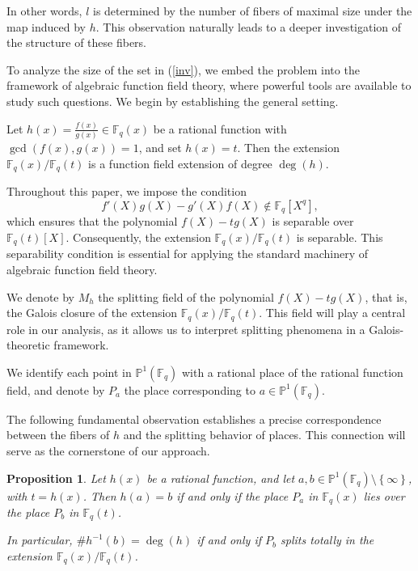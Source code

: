 \documentclass[1p,final]{elsarticle}
\newtheorem{proposition}[theorem]{Proposition}
\newtheorem{open problem}[theorem]{Open Problem}
\begin{document}
In other words, $l$ is determined by the number of fibers of maximal size under the map induced by $h$. This observation naturally leads to a deeper investigation of the structure of these fibers.

\medskip

To analyze the size of the set in (\ref{inv}), we embed the problem into the framework of algebraic function field theory, where powerful tools are available to study such questions. We begin by establishing the general setting.

\medskip

Let $h(x)=\displaystyle\frac{f(x)}{g(x)}\in \mathbb{F}_q(x)$ be a rational function with $\gcd(f(x),g(x))=1$, and set $h(x)=t$. Then the extension $\mathbb{F}_q(x)/\mathbb{F}_q(t)$ is a function field extension of degree $\deg(h)$.

Throughout this paper, we impose the condition 
\[
f'(X)g(X)-g'(X)f(X)\notin \mathbb{F}_{q}[X^{q}],
\]
which ensures that the polynomial $f(X)-tg(X)$ is separable over $\mathbb{F}_{q}(t)[X]$. Consequently, the extension $\mathbb{F}_q(x)/\mathbb{F}_q(t)$ is separable. This separability condition is essential for applying the standard machinery of algebraic function field theory.

\medskip

We denote by $M_{h}$ the splitting field of the polynomial $f(X)-tg(X)$, that is, the Galois closure of the extension $\mathbb{F}_q(x)/\mathbb{F}_q(t)$. This field will play a central role in our analysis, as it allows us to interpret splitting phenomena in a Galois-theoretic framework.

\medskip

We identify each point in $ \mathbb{P}^{1}(\mathbb{F}_{q})$ with a rational place of the rational function field, and denote by $P_{a}$ the place corresponding to $a\in \mathbb{P}^{1}(\mathbb{F}_{q})$.

\medskip

The following fundamental observation establishes a precise correspondence between the fibers of $h$ and the splitting behavior of places. This connection will serve as the cornerstone of our approach.

\begin{proposition}\label{split com} 
Let $h(x)$ be a rational function, and let $a,b\in \mathbb{P}^{1}(\mathbb{F}_{q})\setminus \left \{ \infty  \right \}$, with $t=h(x)$. Then $h(a)=b$ if and only if the place $P_{a}$ in $\mathbb{F}_{q}(x)$ lies over the place $P_{b}$ in $\mathbb{F}_{q}(t)$. 

In particular, $\# h^{-1}(b)=\deg(h)$ if and only if $P_{b}$ splits totally in the extension $\mathbb{F}_q(x)/\mathbb{F}_q(t)$.
\end{proposition} 
\end{document}
